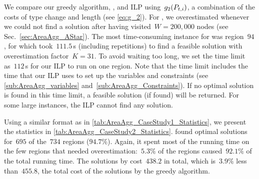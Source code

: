 We compare our greedy algorithm, \Astar, and ILP
using~$g_2(P_{t,i})$,
a combination of the costs 
of type change and length (see \eq\ref{eq:g_2}).
For \Astar, we overestimated 
whenever we could not find a solution after 
having visited~$W=200{,}000$ nodes (see 
Sec.~\ref{sec:AreaAgg_AStar}).
The most time-consuming instance for \Astar was region~$94$,
for which \Astar took~$111.5\,$s (including repetitions)
to find a feasible solution 
with overestimation factor~$K=31$.
To avoid waiting too long,
we set the time limit as~$112\,$s 
for our ILP to run on one region.
Note that the time limit includes
the time that our ILP uses 
to set up the variables and constraints
(see \sects\ref{sub:AreaAgg_variables} 
and~\ref{sub:AreaAgg_Constraints}).
If no optimal solution is found in this time limit,
a feasible solution (if found) will be returned.
For some large instances, 
the ILP cannot find any solution.

Using a similar format as in \tab\ref{tab:AreaAgg_CaseStudy1_Statistics},
we present the statistics in 
\tab\ref{tab:AreaAgg_CaseStudy2_Statistics}.
\Astar found optimal solutions 
for~$695$ of the~$734$ regions ($94.7\%$).
Again, it spent most of the running time 
on the few regions that needed 
overestimation:~$5.3\%$ of the regions 
caused~$92.1\%$ of the total running time.
The solutions by \Astar cost~$438.2$ in total, 
which is~$3.9\%$ less than~$455.8$, 
the total cost of the solutions by the greedy algorithm.

